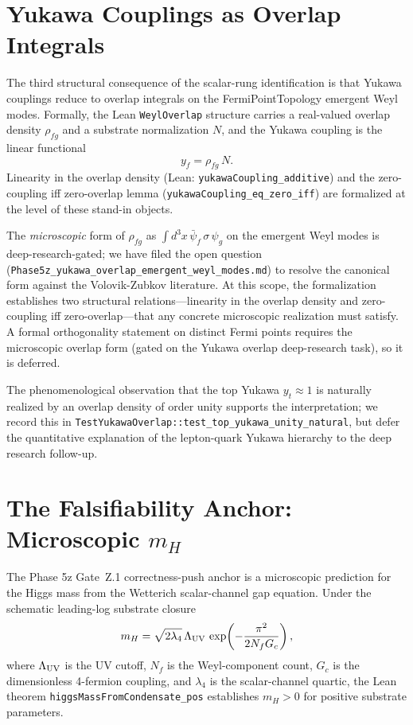 \documentclass[aps,prd,twocolumn,showpacs,superscriptaddress,nofootinbib]{revtex4-2}
\newcommand{\WetterichScalar}{\sigma}
\newcommand{\YukawaCoupling}{y}
\begin{document}
\section{Yukawa Couplings as Overlap Integrals}
\label{sec:yukawa-overlap}

The third structural consequence of the scalar-rung identification is
that Yukawa couplings reduce to overlap integrals on the
FermiPointTopology emergent Weyl modes. Formally, the Lean
\texttt{WeylOverlap} structure carries a real-valued overlap density
$\rho_{fg}$ and a substrate normalization $N$, and the Yukawa coupling
is the linear functional
\begin{equation}
\YukawaCoupling_f = \rho_{fg}\,N.
\end{equation}
Linearity in the overlap density (Lean:
\texttt{yukawaCoupling\_additive}) and the zero-coupling iff
zero-overlap lemma (\texttt{yukawaCoupling\_eq\_zero\_iff})
are formalized at the level of these stand-in objects.

The \emph{microscopic} form of $\rho_{fg}$ as
$\int d^3x\,\bar\psi_f\,\WetterichScalar\,\psi_g$ on the
emergent Weyl modes is deep-research-gated; we have filed the open
question (\texttt{Phase5z\_yukawa\_overlap\_emergent\_weyl\_modes.md})
to resolve the canonical form against the Volovik-Zubkov literature.
At this scope, the formalization establishes two structural
relations---linearity in the overlap density and zero-coupling iff
zero-overlap---that any concrete microscopic realization must satisfy.
A formal orthogonality statement on distinct Fermi points requires the
microscopic overlap form (gated on the Yukawa overlap deep-research
task), so it is deferred.

The phenomenological observation that the top Yukawa $y_t \approx 1$
is naturally realized by an overlap density of order unity supports
the interpretation; we record this in
\texttt{TestYukawaOverlap::test\_top\_yukawa\_unity\_natural}, but defer
the quantitative explanation of the lepton-quark Yukawa hierarchy to the
deep research follow-up.

\section{The Falsifiability Anchor: Microscopic $m_H$}
\label{sec:falsifiability}

The Phase 5z Gate~Z.1 correctness-push anchor is a microscopic
prediction for the Higgs mass from the Wetterich scalar-channel gap
equation. Under the schematic leading-log substrate closure
\begin{equation}
\label{eq:m-h-condensate}
m_H = \sqrt{2\lambda_4}\,\Lambda_{\rm UV}\,
\exp\!\left(-\frac{\pi^2}{2 N_f G_c}\right),
\end{equation}
where $\Lambda_{\rm UV}$ is the UV cutoff, $N_f$ is the Weyl-component
count, $G_c$ is the dimensionless 4-fermion coupling, and $\lambda_4$ is
the scalar-channel quartic, the Lean theorem
\texttt{higgsMassFromCondensate\_pos} establishes
$m_H > 0$ for positive substrate parameters.
\end{document}
